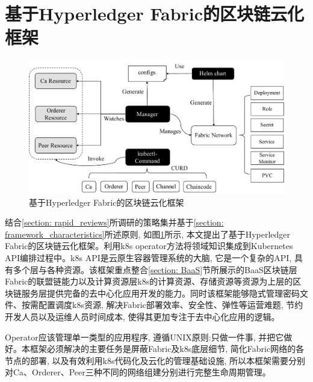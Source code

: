 \section{基于Hyperledger Fabric的区块链云化框架}

\begin{figure}[h] %
    \centering %
    \includegraphics[width=1.0\textwidth]{FIGs/chapter3/framework.pdf} %
    \caption{基于Hyperledger Fabric的区块链云化框架} %
    \label{framework} %
\end{figure}%

结合\ref{section: rapid_reviews}所调研的策略集并基于\ref{section: framework_characteristics}所述原则, 如图\ref{framework}所示, 本文提出了基于Hyperledger Fabric的区块链云化框架。利用k8s operator方法将领域知识集成到Kubernetes API编排过程中\cite{henning2021reproducible}。k8s API是云原生容器管理系统的大脑, 它是一个复杂的API, 具有多个层与各种资源\cite{Yilmaz2021}。该框架重点整合\ref{section: BaaS}节所展示的BaaS区块链层Fabric的联盟链能力以及计算资源层k8s的计算资源、存储资源等资源为上层的区块链服务层提供完备的去中心化应用开发的能力。同时该框架能够隐式管理密码文件、按需配置调度k8s资源, 解决Fabric部署效率、安全性、弹性等运营难题, 节约开发人员以及运维人员时间成本, 使得其更加专注于去中心化应用的逻辑。

Operator应该管理单一类型的应用程序, 遵循UNIX原则:只做一件事, 并把它做好\cite{d2020design}。本框架必须解决的主要任务是屏蔽Fabric及k8s底层细节, 简化Fabric网络的各节点的部署, 以及有效利用k8s代码化及云化的管理基础设施, 所以本框架需要分别对Ca、Orderer、Peer三种不同的网络组建分别进行完整生命周期管理。


